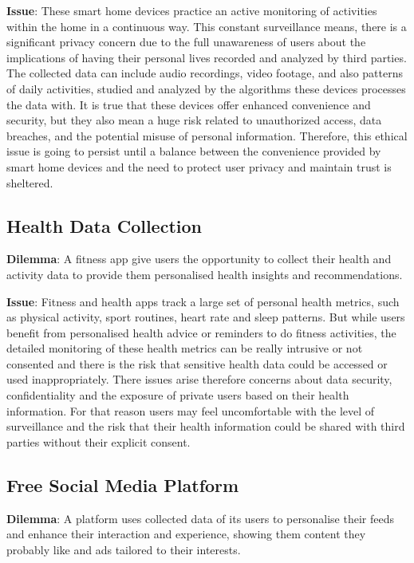 \textbf{Issue}: These smart home devices practice an active monitoring of activities within the home in a continuous way.
This constant surveillance means, there is a significant privacy concern due to the full unawareness of users about the implications of having their personal lives recorded and analyzed by third parties.
The collected data can include audio recordings, video footage, and also patterns of daily activities, studied and analyzed by the algorithms these devices processes the data with.
It is true that these devices offer enhanced convenience and security, but they also mean a huge risk related to unauthorized access, data breaches, and the potential misuse of personal information.
Therefore, this ethical issue is going to persist until a balance between the convenience provided by smart home devices and the need to protect user privacy and maintain trust is sheltered.

\subsection{Health Data Collection}\label{subsec:health-data-collection}

\textbf{Dilemma}: A fitness app give users the opportunity to collect their health and activity data to provide them personalised health insights and recommendations.

\textbf{Issue}: Fitness and health apps track a large set of personal health metrics, such as physical activity, sport routines, heart rate and sleep patterns.
But while users benefit from personalised health advice or reminders to do fitness activities, the detailed monitoring of these health metrics can be really intrusive or not consented and there is the risk that sensitive health data could be accessed or used inappropriately.
There issues arise therefore concerns about data security, confidentiality and the exposure of private users based on their health information.
For that reason users may feel uncomfortable with the level of surveillance and the risk that their health information could be shared with third parties without their explicit consent.

\subsection{Free Social Media Platform}\label{subsec:free-social-media-platform}

\textbf{Dilemma}: A platform uses collected data of its users to personalise their feeds and enhance their interaction and experience, showing them content they probably like and ads tailored to their interests.

